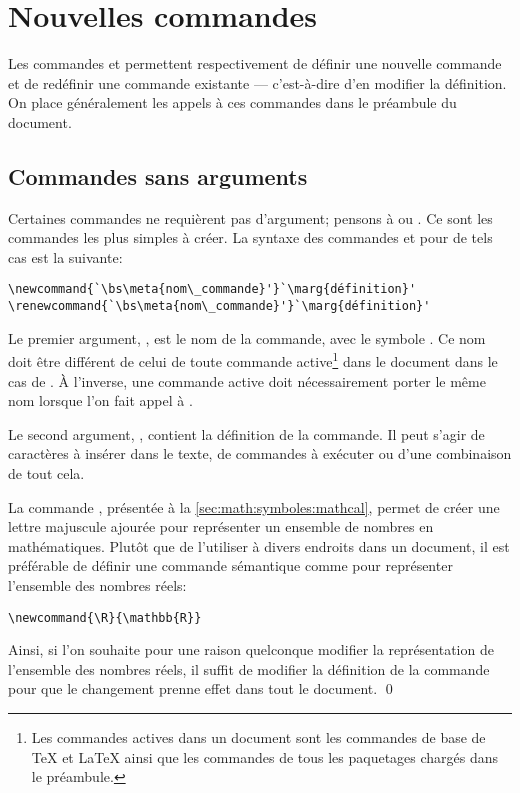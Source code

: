 \section{Nouvelles commandes}
\label{sec:commandes:commandes}

Les commandes \cmd{\newcommand} et \cmd{\renewcommand} permettent
respectivement de définir une nouvelle commande et de redéfinir une
commande existante --- c'est-à-dire d'en modifier la définition. On
place généralement les appels à ces commandes dans le préambule du
document.

\subsection{Commandes sans arguments}
\label{sec:commandes:commandes:sans_arg}

Certaines commandes ne requièrent pas d'argument; pensons à
\cmdprint{\LaTeX} ou \cmdprint{\bfseries}. Ce sont les commandes les
plus simples à créer. La syntaxe des commandes \cmd{\newcommand} et
\cmd{\renewcommand} pour de tels cas est la suivante:
\begin{lstlisting}
\newcommand{`\bs\meta{nom\_commande}'}`\marg{définition}'
\renewcommand{`\bs\meta{nom\_commande}'}`\marg{définition}'
\end{lstlisting}
Le premier argument, \bs{}, est le nom de la
commande, avec le symbole \bs. Ce nom doit être différent de celui
de toute commande active\footnote{%
  Les commandes actives dans un document sont les commandes de base de
  {\TeX} et {\LaTeX} ainsi que les commandes de tous les paquetages
  chargés dans le préambule.} %
dans le document dans le cas de \cmdprint{\newcommand}. À l'inverse,
une commande active doit nécessairement porter le même nom lorsque
l'on fait appel à \cmdprint{\renewcommand}.

Le second argument, , contient la définition de la
commande. Il peut s'agir de caractères à insérer dans le texte, de
commandes à exécuter ou d'une combinaison de tout cela.

\begin{exemple}
  La commande \cmd{\mathbb}, présentée à la
  \autoref{sec:math:symboles:mathcal}, permet de créer une lettre
  majuscule ajourée pour représenter un ensemble de nombres en
  mathématiques. Plutôt que de l'utiliser à divers endroits dans un
  document, il est préférable de définir une commande sémantique comme
  \cmdprint{\R} pour représenter l'ensemble des nombres réels:
\begin{lstlisting}
\newcommand{\R}{\mathbb{R}}
\end{lstlisting}
  Ainsi, si l'on souhaite pour une raison quelconque modifier la
  représentation de l'ensemble des nombres réels, il suffit de
  modifier la définition de la commande \cmdprint{\R} pour que le
  changement prenne effet dans tout le document. %
  \qed
\end{exemple}

